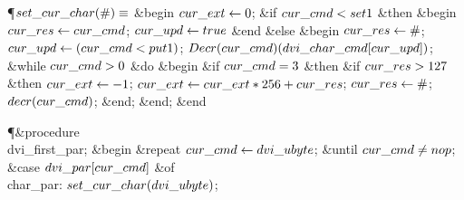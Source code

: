 \Y\P\D {}$\\{set\_cur\_char}(\#)\S$\6
\&{begin} $\\{cur\_ext}\K0$;\6
\&{if} $\\{cur\_cmd}<\\{set1}$ \1\&{then}\6
\&{begin} $\\{cur\_res}\K\\{cur\_cmd}$;\5
$\\{cur\_upd}\K\\{true}$\6
\&{end}\6
\4\&{else} \&{begin} $\\{cur\_res}\K\#$;\5
$\\{cur\_upd}\K(\\{cur\_cmd}<\\{put1})$;\5
$\\{Decr}(\\{cur\_cmd})(\\{dvi\_char\_cmd}[\\{cur\_upd}])$;\6
\&{while} $\\{cur\_cmd}>0$ \1\&{do}\6
\&{begin} \&{if} $\\{cur\_cmd}=3$ \1\&{then}\6
\&{if} $\\{cur\_res}>127$ \1\&{then}\5
$\\{cur\_ext}\K-1$;\2\2\6
$\\{cur\_ext}\K\\{cur\_ext}\ast256+\\{cur\_res}$;\5
$\\{cur\_res}\K\#$;\5
$\\{decr}(\\{cur\_cmd})$;\6
\&{end};\2\6
\&{end};\2\6
\&{end}\par
\Y\P\4\&{procedure}\1\  \\{dvi\_first\_par};\2\6
\&{begin} \1\&{repeat} $\\{cur\_cmd}\K\\{dvi\_ubyte}$;\6
\4\&{until}\5
$\\{cur\_cmd}\I\\{nop}$;\2\6
\&{case} $\\{dvi\_par}[\\{cur\_cmd}]$ \1\&{of}\6
\4\\{char\_par}: $\\{set\_cur\_char}(\\{dvi\_ubyte})$;\6

